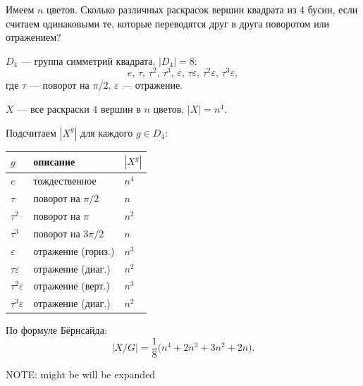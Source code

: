 \begin{example}
    Имеем $n$ цветов. Сколько различных раскрасок вершин квадрата из $4$ бусин, если считаем одинаковыми те, которые переводятся друг в друга поворотом или отражением?

    $D_4$ --- группа симметрий квадрата, $|D_4| = 8$:
    \[
        e,\, \tau,\, \tau^2,\, \tau^3,\, \varepsilon,\, \tau\varepsilon,\, \tau^2\varepsilon,\, \tau^3\varepsilon,
    \]
    где $\tau$ --- поворот на $\pi/2$, $\varepsilon$ --- отражение.

    $X$ --- все раскраски $4$ вершин в $n$ цветов, $|X| = n^4$.

    Подсчитаем $|X^g|$ для каждого $g \in D_4$:

    \begin{center}
    \begin{tabular}{l|l|l}
        $g$ & описание & $|X^g|$ \\
        \hline
        $e$ & тождественное & $n^4$ \\
        $\tau$ & поворот на $\pi/2$ & $n$ \\
        $\tau^2$ & поворот на $\pi$ & $n^2$ \\
        $\tau^3$ & поворот на $3\pi/2$ & $n$ \\
        $\varepsilon$ & отражение (гориз.) & $n^3$ \\
        $\tau\varepsilon$ & отражение (диаг.) & $n^2$ \\
        $\tau^2\varepsilon$ & отражение (верт.) & $n^3$ \\
        $\tau^3\varepsilon$ & отражение (диаг.) & $n^2$ \\
    \end{tabular}
    \end{center}

    По формуле Бёрнсайда:
    \[
        |X / G| = \frac{1}{8}\bigl(n^4 + 2n^3 + 3n^2 + 2n\bigr).
    \]


    NOTE: might be will be expanded
\end{example}
